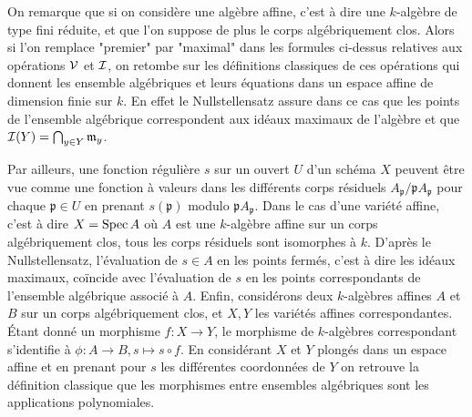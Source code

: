 \begin{rem}
On remarque que si on considère une algèbre affine, c'est à dire une $k$-algèbre de type fini réduite, et que l'on suppose de plus le corps algébriquement clos. Alors si l'on remplace "premier" par "maximal" dans les formules ci-dessus relatives aux opérations $\mathcal{V}$ et $\mathcal{I}$, on retombe sur les définitions classiques de ces opérations qui donnent les ensemble algébriques et leurs équations dans un espace affine de dimension finie sur $k$. En effet le Nullstellensatz assure dans ce cas que les points de l'ensemble algébrique correspondent aux idéaux maximaux de l'algèbre et que $\mathcal{I}(Y)=\bigcap_{y\in Y}\mathfrak{m}_y$.

Par ailleurs, une fonction régulière $s$ sur un ouvert $U$ d'un schéma $X$ peuvent être vue comme une fonction à valeurs dans les différents corps résiduels $A_\mathfrak{p}/\mathfrak{p}A_\mathfrak{p}$ pour chaque $\mathfrak{p}\in U$ en prenant $s(\mathfrak{p})$ modulo $\mathfrak{p}A_\mathfrak{p}$. Dans le cas d'une variété affine, c'est à dire $X=\operatorname{Spec} A$ où $A$ est une $k$-algèbre affine sur un corps algébriquement clos, tous les corps résiduels sont isomorphes à $k$. D'après le Nullstellensatz, l'évaluation de $s\in A$ en les points fermés, c'est à dire les idéaux maximaux, coïncide avec l'évaluation de $s$ en les points correspondants de l'ensemble algébrique associé à $A$. Enfin, considérons deux $k$-algèbres affines $A$ et $B$ sur un corps algébriquement clos, et $X, Y$ les variétés affines correspondantes. Étant donné un morphisme $f:X\rightarrow Y$, le morphisme de $k$-algèbres correspondant s'identifie à $\phi:A\rightarrow B,s\mapsto s\circ f$. En considérant $X$ et $Y$ plongés dans un espace affine et en prenant pour $s$ les différentes coordonnées de $Y$ on retrouve la définition classique que les morphismes entre ensembles algébriques sont les applications polynomiales.
\end{rem}

